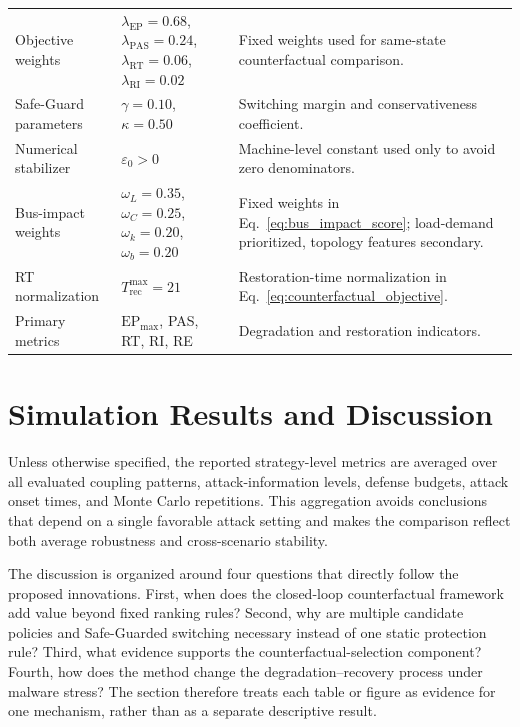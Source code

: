 \documentclass[lettersize,journal]{IEEEtran}
\begin{document}
\begin{table}[!t]
\begin{tabular}{p{} p{} p{}}
\rowcolor{RowPhysical}
Objective weights & $\lambda_{\mathrm{EP}}=0.68$, $\lambda_{\mathrm{PAS}}=0.24$, $\lambda_{\mathrm{RT}}=0.06$, $\lambda_{\mathrm{RI}}=0.02$ & Fixed weights used for same-state counterfactual comparison. \\
\rowcolor{RowRisk}
Safe-Guard parameters & $\gamma=0.10$, $\kappa=0.50$ & Switching margin and conservativeness coefficient. \\
\rowcolor{RowNeutral}
Numerical stabilizer & $\varepsilon_0>0$ & Machine-level constant used only to avoid zero denominators. \\
\rowcolor{RowScenario}
Bus-impact weights & $\omega_L=0.35$, $\omega_C=0.25$, $\omega_k=0.20$, $\omega_b=0.20$ & Fixed weights in Eq.~\eqref{eq:bus_impact_score}; load-demand prioritized, topology features secondary. \\
\rowcolor{RowPhysical}
RT normalization & $T_{\mathrm{rec}}^{\max}=21$ & Restoration-time normalization in Eq.~\eqref{eq:counterfactual_objective}. \\
\rowcolor{RowNeutral}
Primary metrics & $\mathrm{EP}_{\max}$, PAS, RT, RI, RE & Degradation and restoration indicators. \\
\bottomrule
\end{tabular}
\end{table}

\section{Simulation Results and Discussion}
\label{sec:results}

Unless otherwise specified, the reported strategy-level metrics are averaged over all evaluated coupling patterns, attack-information levels, defense budgets, attack onset times, and Monte Carlo repetitions. This aggregation avoids conclusions that depend on a single favorable attack setting and makes the comparison reflect both average robustness and cross-scenario stability.

The discussion is organized around four questions that directly follow the proposed innovations. First, when does the closed-loop counterfactual framework add value beyond fixed ranking rules? Second, why are multiple candidate policies and Safe-Guarded switching necessary instead of one static protection rule? Third, what evidence supports the counterfactual-selection component? Fourth, how does the method change the degradation--recovery process under malware stress? The section therefore treats each table or figure as evidence for one mechanism, rather than as a separate descriptive result.
\end{document}
